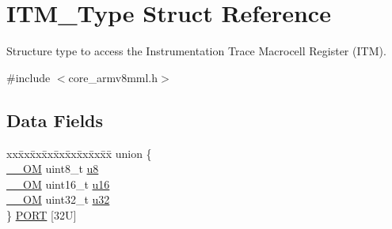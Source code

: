 \hypertarget{struct_i_t_m___type}{}\section{I\+T\+M\+\_\+\+Type Struct Reference}
\label{struct_i_t_m___type}


Structure type to access the Instrumentation Trace Macrocell Register (I\+TM).  




{\ttfamily \#include $<$core\+\_\+armv8mml.\+h$>$}

\subsection*{Data Fields}
\begin{DoxyCompactItemize}
\item 
\begin{tabbing}
xx\=xx\=xx\=xx\=xx\=xx\=xx\=xx\=xx\=\kill
union \{\\
\>\mbox{\hyperlink{core__cm4_8h_a0ea2009ed8fd9ef35b48708280fdb758}{\_\_OM}} uint8\_t \mbox{\hyperlink{struct_i_t_m___type_a4c0550e859d614c607bd4b575f05425c}{u8}}\\
\>\mbox{\hyperlink{core__cm4_8h_a0ea2009ed8fd9ef35b48708280fdb758}{\_\_OM}} uint16\_t \mbox{\hyperlink{struct_i_t_m___type_ae93660eefe2482a8564fae9a1ca39739}{u16}}\\
\>\mbox{\hyperlink{core__cm4_8h_a0ea2009ed8fd9ef35b48708280fdb758}{\_\_OM}} uint32\_t \mbox{\hyperlink{struct_i_t_m___type_ae89dd50f788f12863c681fba1a5b60d1}{u32}}\\
\} \mbox{\hyperlink{struct_i_t_m___type_afee369623a7e583097a711ed6b435730}{PORT}} \mbox{[}32U\mbox{]}\\


\end{tabbing}
\end{DoxyCompactItemize}
